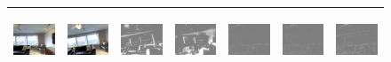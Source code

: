 \documentclass[letterpaper, 10 pt, conference]{ieeeconf}  %
\begin{document}
\begin{figure}[h!]
\begin{center}
\begin{tabular}{|c| c |c | c | c | c | c|}
\includegraphics[width=18mm, height=17mm]{TrueDepth/MESIC/init.png} &   
            \includegraphics[width=18mm, height=17mm]{TrueDepth/MESIC/des.png} & 
              \includegraphics[width=18mm, height=17mm]{PhotoVS/MESIC/ferror.png} &   \includegraphics[width=18mm, height=17mm]{ICRA17/MESIC/ferror.png} & 
 \includegraphics[width=18mm, height=17mm]{TrueDepth/MESIC/ferror.png} &
  \includegraphics[width=18mm, height=17mm]{DepthNetwork/MESIC/ferror.png} &
   \includegraphics[width=18mm, height=17mm]{FlowDepth/MESIC/ferror.png}
 \\ \hline


\end{tabular}
\end{center}
\end{figure}
\end{document}
